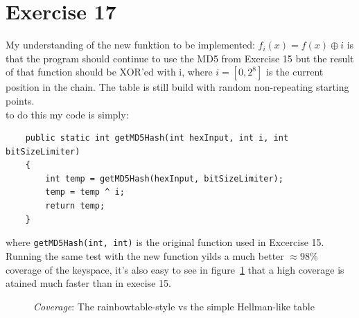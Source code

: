 \section*{Exercise 17}
My understanding of the new funktion to be implemented: $f_i(x) = f(x) \oplus i$ 
is that the program should continue to use the MD5 from Exercise 15 but the
result of that function should be XOR'ed with i, where $i = [0, 2^8]$ is the
current position in the chain. The table is still build with random
non-repeating starting points.\\
to do this my code is simply:
\begin{lstlisting}
	public static int getMD5Hash(int hexInput, int i, int bitSizeLimiter)
	{
		int temp = getMD5Hash(hexInput, bitSizeLimiter);
		temp = temp ^ i;
		return temp;
	}
\end{lstlisting}
where \lstinline{getMD5Hash(int, int)}
is the original function used in Excercise 15.\\
Running the same test with the new function yilds a much better $\approx
98\%$ coverage of the keyspace, it's also easy to see in
figure~\ref{fig:Rainbow} that a high coverage is atained much faster than in
execise 15.
\FloatBarrier
\begin{figure}[h]
\centering
{}
\caption{\emph{Coverage}: The rainbowtable-style vs the simple 
Hellman-like table}
\label{fig:Rainbow}
\end{figure}
\FloatBarrier